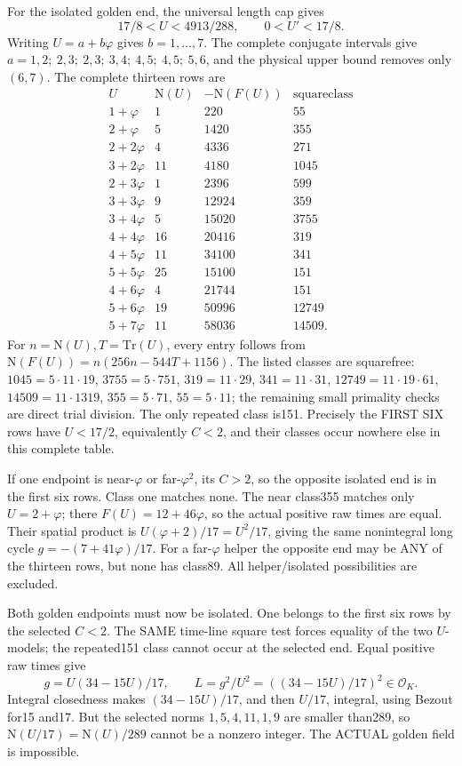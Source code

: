 \documentclass[11pt]{article}
\begin{document}
For the isolated golden end, the universal length cap gives
\[
                       17/8<U<4913/288,\qquad0<U'<17/8 .
\]
Writing \(U=a+b\varphi\) gives \(b=1,\ldots,7\).
The complete conjugate intervals give
\(a=1,2;\ 2,3;\ 2,3;\ 3,4;\ 4,5;\ 4,5;\ 5,6\),
and the physical upper bound removes only \((6,7)\).
The complete thirteen rows are
\[
\begin{array}{c|r|r|r}
U&\mathrm N(U)&-\mathrm N(F(U))&\text{squareclass}\\ \hline
1+\varphi&1&220&55\\
2+\varphi&5&1420&355\\
2+2\varphi&4&4336&271\\
3+2\varphi&11&4180&1045\\
2+3\varphi&1&2396&599\\
3+3\varphi&9&12924&359\\
3+4\varphi&5&15020&3755\\
4+4\varphi&16&20416&319\\
4+5\varphi&11&34100&341\\
5+5\varphi&25&15100&151\\
4+6\varphi&4&21744&151\\
5+6\varphi&19&50996&12749\\
5+7\varphi&11&58036&14509 .
\end{array}
\]
For \(n=\mathrm N(U),T=\mathrm{Tr}(U)\), every entry follows from
\(\mathrm N(F(U))=n(256n-544T+1156)\).
The listed classes are squarefree:
\(1045=5\cdot11\cdot19\), \(3755=5\cdot751\),
\(319=11\cdot29\), \(341=11\cdot31\),
\(12749=11\cdot19\cdot61\), \(14509=11\cdot1319\),
\(355=5\cdot71\), \(55=5\cdot11\);
the remaining small primality checks are direct trial division.
The only repeated class is151.
Precisely the FIRST SIX rows have \(U<17/2\), equivalently \(C<2\),
and their classes occur nowhere else in this complete table.

If one endpoint is near-\(\varphi\) or far-\(\varphi^2\),
its \(C>2\), so the opposite isolated end is in the first six rows.
Class one matches none.
The near class355 matches only \(U=2+\varphi\);
there \(F(U)=12+46\varphi\), so the actual positive raw
times are equal.
Their spatial product is \(U(\varphi+2)/17=U^2/17\),
giving the same nonintegral long cycle
\(g=-(7+41\varphi)/17\).
For a far-\(\varphi\) helper the opposite end may be ANY of
the thirteen rows, but none has class89.
All helper/isolated possibilities are excluded.

Both golden endpoints must now be isolated.
One belongs to the first six rows by the selected \(C<2\).
The SAME time-line square test forces equality of the two
\(U\)-models; the repeated151 class cannot occur at the selected end.
Equal positive raw times give
\[
 g=U(34-15U)/17,\qquad
 L=g^2/U^2=((34-15U)/17)^2\in\mathcal O_K .
\]
Integral closedness makes \((34-15U)/17\), and then \(U/17\),
integral, using Bezout for15 and17.
But the selected norms \(1,5,4,11,1,9\) are smaller than289,
so \(\mathrm N(U/17)=\mathrm N(U)/289\) cannot be a
nonzero integer.
The ACTUAL golden field is impossible.
\end{document}
